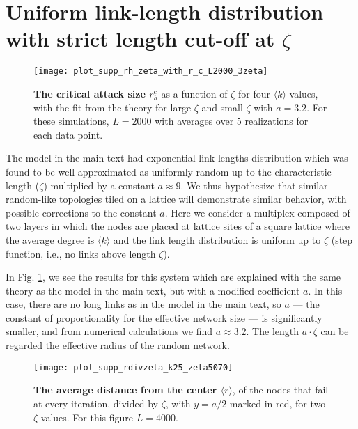 \documentclass[twocolumn,noshowpacs,pre,preprintnumbers,superscriptaddress,amsmath,amssymb,floatfix]{revtex4}
\newcommand{\kk}{\langle k \rangle}
\begin{document}
	\section{Uniform link-length distribution with strict length cut-off at $\zeta$}
	
	\FloatBarrier
	
	\begin{figure}
		\texttt{[image: plot\_supp\_rh\_zeta\_with\_r\_c\_L2000\_3zeta]}
		\caption{\textbf{The critical attack size $r_h^c$} 
			as a function of $\zeta$ for four $\kk$ values, with the fit from the theory for large $\zeta$ and small $\zeta$ with $a = 3.2$.
			For these simulations, $L = 2000$ with averages over 5 realizations for each data point.}
		\label{fig: rh_zeta2}	
	\end{figure}
	
	The model in the main text had exponential link-lengths distribution which was found to be well approximated as uniformly random up to the characteristic length ($\zeta$) multiplied by a constant $a\approx 9$.
	We thus hypothesize that similar random-like topologies tiled on a lattice will demonstrate similar behavior, with possible corrections to the constant $a$.
	Here we consider a multiplex composed of two layers in which the nodes are placed at lattice sites of a square lattice where the average degree is $\kk$ and the link length distribution is uniform up to $\zeta$ (step function, i.e., no links above length $\zeta$).
	
	In Fig. \ref{fig: rh_zeta2}, we see the results for this system which are explained with the same theory as the model in the main text, but with a modified coefficient $a$.
	In this case, there are no long links as in the model in the main text, so $a$ --- the constant of proportionality for the effective network size --- is significantly smaller, and from numerical calculations we find $a \approx 3.2$.
	The length $a\cdot \zeta$ can be regarded the effective radius of the random network.
	
	\begin{figure}
		\texttt{[image: plot\_supp\_rdivzeta\_k25\_zeta5070]}
		\caption{\textbf{The average distance from the center $\langle r \rangle$}, of the nodes that fail at every iteration, divided by $\zeta$, with $ y = a/2$ marked in red, for two $\zeta$ values.
			For this figure $L = 4000$.}
		\label{fig: r_average2}
		
	\end{figure}
	
\end{document}
